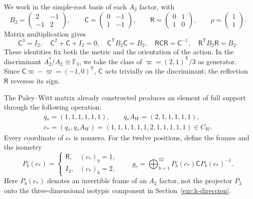 We work in the simple-root basis of each \(A_2\) factor, with
\begin{equation}
 B_2=\begin{pmatrix}2&-1\\-1&2\end{pmatrix},\qquad
 \mathsf C=\begin{pmatrix}0&-1\\1&-1\end{pmatrix},\qquad
 \mathsf R=\begin{pmatrix}0&1\\1&0\end{pmatrix},\qquad
 \rho=\begin{pmatrix}1\\1\end{pmatrix}.
 \label{km:coxeter-reflexion}
\end{equation}
Matrix multiplication gives
\[
 \mathsf C^3=I_2,\quad
 \mathsf C^2+\mathsf C+I_2=0,\quad
 \mathsf C^{\mathsf T}B_2\mathsf C=B_2,\quad
 \mathsf R\mathsf C\mathsf R=\mathsf C^{-1},\quad
 \mathsf R^{\mathsf T}B_2\mathsf R=B_2.
\]
These identities fix both the metric and the orientation of the action.
In the discriminant \(A_2^*/A_2\cong\mathbb F_3\), we take the class
of \(\varpi=(2,1)^{\mathsf T}/3\) as generator.
Since \(\mathsf C\varpi-\varpi=(-1,0)^{\mathsf T}\),
\(\mathsf C\) acts trivially on the discriminant; the reflection
\(\mathsf R\) reverses its sign.

The Paley--Witt matrix already constructed produces an element of full
support through the following operation:
\begin{equation}
 \begin{gathered}
 q_*=(1,1,1,1,1,1),\qquad q_*A_W=(2,1,1,1,1,1),\\
 c_*=(q_*,q_*A_W)
 =(1,1,1,1,1,1,2,1,1,1,1,1)\in C_W.
 \end{gathered}
 \label{km:palabra-total}
\end{equation}
Every coordinate of \(c_*\) is nonzero. For the twelve positions,
define the frames and the isometry
\begin{equation}
 P_b(c_*)=
 \begin{cases}\mathsf R,&(c_*)_b=1,\\I_2,&(c_*)_b=2,\end{cases}
 \qquad
 g_c=\bigoplus_{b=1}^{12}P_b(c_*)\mathsf C P_b(c_*)^{-1}.
 \label{km:isometria-ternaria}
\end{equation}
Here \(P_b(c_*)\) denotes an invertible frame of an \(A_2\) factor,
not the projector \(P_3\) onto the three-dimensional isotypic component
in Section~\ref{exc:k-direccion}.

